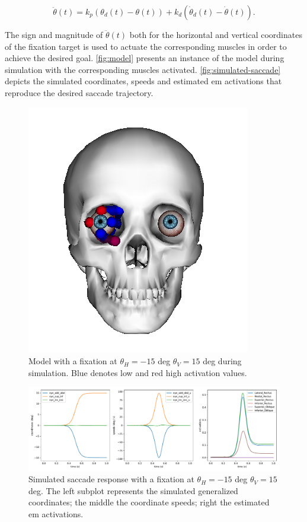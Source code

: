 \documentclass[11pt,a4paper,draft=false]{report}
\begin{document}
\begin{equation}\label{equ:pd-controller}
  \ddot{\theta}(t) = k_p (\theta_d(t) - \theta(t)) + k_d (\dot{\theta}_d(t) -
  \dot{\theta}(t)).
\end{equation}

The sign and magnitude of $\ddot{\theta}(t)$ both for the horizontal and
vertical coordinates of the fixation target is used to actuate the corresponding
muscles in order to achieve the desired goal. \autoref{fig:model} presents an
instance of the model during simulation with the corresponding muscles
activated. \autoref{fig:simulated-saccade} depicts the simulated coordinates,
speeds and estimated \gls{em} activations that reproduce the desired saccade
trajectory.

\begin{figure}[ht]
  \centering
  \includegraphics[width=.6\textwidth]{model.png}
  \caption{Model with a fixation at $\theta_H = -15$ deg $\theta_V = 15$ deg
    during simulation. Blue denotes low and red high activation
    values.}\label{fig:model}
\end{figure}

\begin{figure}[ht]
  \centering
  \includegraphics[width=1.\textwidth]{UPAT_Eye_Model_Passive_Pulleys_v3_States[-15][15].pdf}
  \caption{Simulated saccade response with a fixation at $\theta_H = -15$ deg
    $\theta_V = 15$ deg. The left subplot represents the simulated generalized
    coordinates; the middle the coordinate speeds; right the estimated \gls{em}
    activations.}\label{fig:simulated-saccade}
\end{figure}
\end{document}
